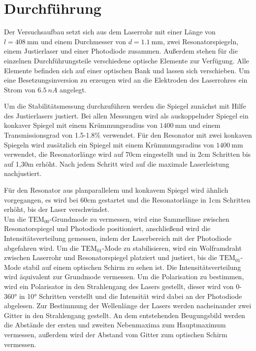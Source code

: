 \section{Durchführung}
\label{sec:Durchführung}
Der Versuchsaufbau setzt sich aus dem Laserrohr mit einer Länge von $l=\SI{408}{\mm}$ und einem
Durchmesser von $d=\SI{1.1}{\mm}$, zwei Resonatorspiegeln, einem Justierlaser
und einer Photodiode zusammen. Außerdem stehen für die einzelnen Durchführungsteile verschiedene
optische Elemente zur Verfügung. Alle Elemente befinden sich auf einer optischen Bank und lassen
sich verschieben. Um eine Besetzungsinversion zu erzeugen wird an die Elektroden des Laserrohres ein
Strom von $\SI{6.5}{nA}$ angelegt.

Um die Stabilitätsmessung durchzuführen werden die Spiegel zunächst mit Hilfe des Justierlasers
justiert. Bei allen Messungen wird als auskoppelnder Spiegel ein konkaver Spiegel mit einem Krümmungsradius
von $\SI{1400}{\mm}$ und einem Transmissionsgrad von 1.5-1.8\% verwendet.
Für den Resonator mit zwei konkaven Spiegeln wird zusätzlich ein Spiegel mit einem Krümmungsradius von $\SI{1400}{\mm}$ verwendet,
die Resonatorlänge wird auf 70\;cm eingestellt
und in 2\;cm Schritten bis auf 1,30\;m erhöht. Nach jedem Schritt wird auf die maximale Laserleistung nachjustiert.

Für den Resonator aus planparallelem und konkavem Spiegel wird ähnlich vorgegangen, es wird bei 60\;cm gestartet und die
Resonatorlänge in 1\;cm Schritten erhöht, bis der Laser verschwindet.\\
Um die $\text{TEM}_{00}$-Grundmode zu vermessen, wird eine Sammellinse zwischen Resonatorspiegel und Photodiode
positioniert, anschließend wird die Intensitätsverteilung gemessen, indem der Laserbereich mit der Photodiode
abgefahren wird. Um die $\text{TEM}_{01}$-Mode zu stabilisieren, wird ein Wolframdraht zwischen Laserrohr und
Resonatorspiegel platziert und justiert, bis die $\text{TEM}_{01}$-Mode stabil auf einem optischen Schirm zu sehen ist.
Die Intensitätsverteilung wird äquivalent zur Grundmode vermessen.
Um die Polarisation zu bestimmen, wird ein Polarisator in den Strahlengang des Lasers gestellt, dieser wird von
0-360° in 10° Schritten verstellt und die Intensität wird dabei an der Photodiode abgelesen.
Zur Bestimmung der Wellenlänge der Lasers werden nacheinander zwei Gitter in den Strahlengang gestellt.
An dem entstehenden Beugungsbild werden die Abstände der ersten und zweiten Nebenmaxima zum Hauptmaximum vermessen,
außerdem wird der Abstand vom Gitter zum optischen Schirm vermessen.

